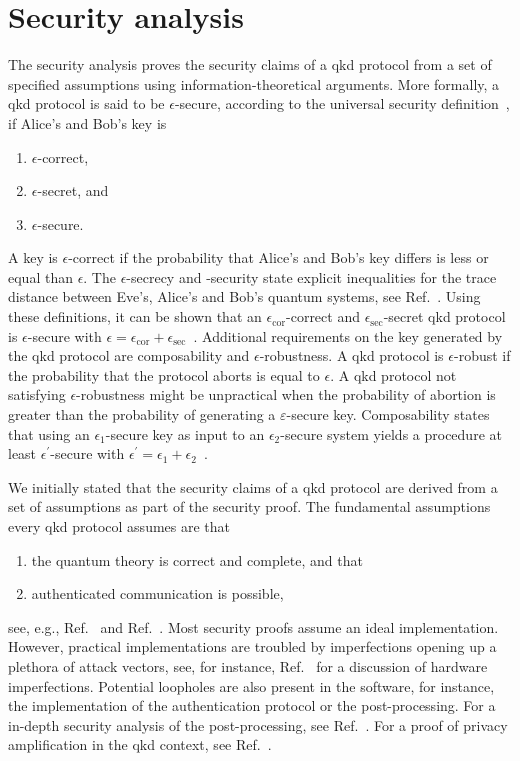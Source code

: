 \section{Security analysis}

The security analysis proves the security claims of a \gls{qkd} protocol from a set of specified assumptions using information-theoretical arguments.
More formally, a \gls{qkd} protocol is said to be $\epsilon$-secure, according to the universal security definition~\cite[p.~119]{Wolf2021}, if Alice's and Bob's key is
\begin{enumerate}
	\item $\epsilon$-correct,
	\item $\epsilon$-secret, and
	\item $\epsilon$-secure.
\end{enumerate}
A key is $\epsilon$-correct if the probability that Alice's and Bob's key differs is less or equal than $\epsilon$.
The $\epsilon$-secrecy and -security state explicit inequalities for the trace distance between Eve's, Alice's and Bob's quantum systems, see Ref.~\cite[p.~120]{Wolf2021}.
Using these definitions, it can be shown that an $\epsilon_\text{cor}$-correct and $\epsilon_\text{sec}$-secret \gls{qkd} protocol is $\epsilon$-secure with $\epsilon=\epsilon_\text{cor}+\epsilon_\text{sec}$~\cite[p.~122]{Wolf2021}.
Additional requirements on the key generated by the \gls{qkd} protocol are composability and $\epsilon$-robustness.
A \gls{qkd} protocol is $\epsilon$-robust if the probability that the protocol aborts is equal to $\epsilon$.
A \gls{qkd} protocol not satisfying $\epsilon$-robustness might be unpractical when the probability of abortion is greater than the probability of generating a $\varepsilon$-secure key.
Composability states that using an $\epsilon_1$-secure key as input to an $\epsilon_2$-secure system yields a procedure at least $\epsilon^\prime$-secure with $\epsilon^\prime=\epsilon_1+\epsilon_2$~\cite[p.~10]{Scarani2009}.

We initially stated that the security claims of a \gls{qkd} protocol are derived from a set of assumptions as part of the security proof.
The fundamental assumptions every \gls{qkd} protocol assumes are that
\begin{enumerate}
	\item the quantum theory is correct and complete, and that
	\item authenticated communication is possible,
\end{enumerate}
see, e.g., Ref.~\cite[p.~124]{Wolf2021} and Ref.~\cite[p.~10]{Scarani2009}.
Most security proofs assume an ideal implementation.
However, practical implementations are troubled by imperfections opening up a plethora of attack vectors, see, for instance, Ref.~\cite[p.~8]{Lo2014} for a discussion of hardware imperfections.
Potential loopholes are also present in the software, for instance, the implementation of the authentication protocol or the post-processing.
For a in-depth security analysis of the post-processing, see Ref.~\cite{Fung2010}.
For a proof of privacy amplification in the \gls{qkd} context, see Ref.~\cite{Renner2005}.

